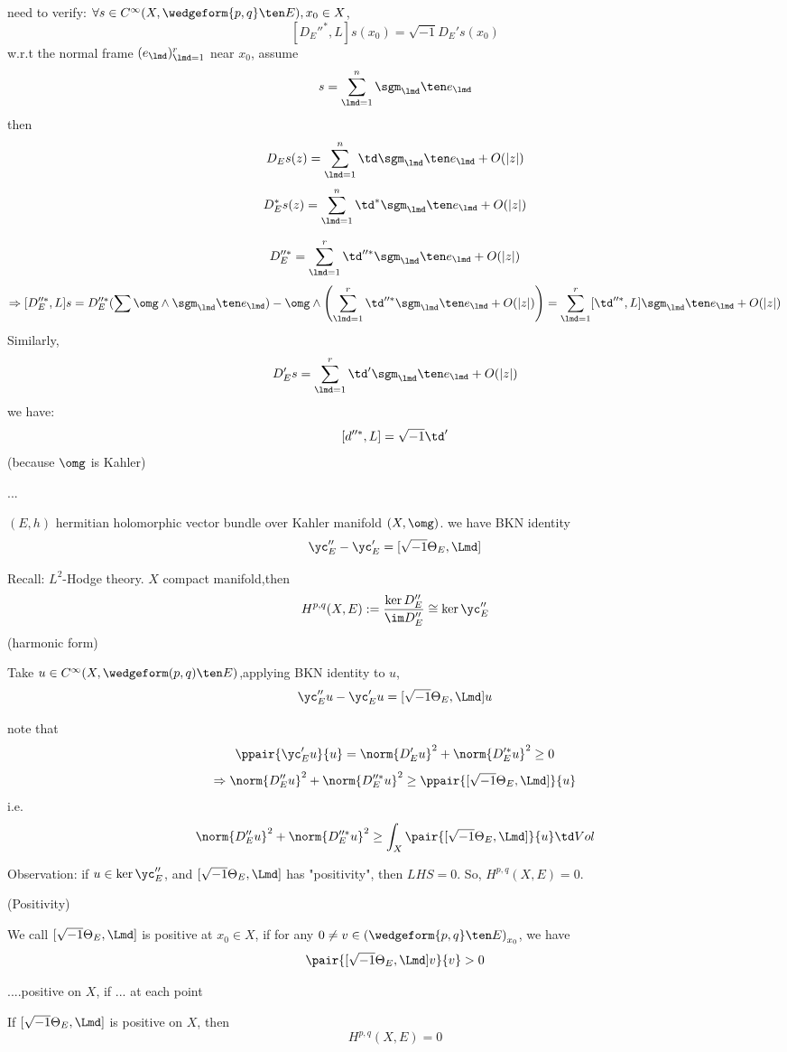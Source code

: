 need to verify: $\forall s\in C^\infty(X,\wedgeform{p,q}\ten E),x_0\in X$,
$$[D_E''^*,L]s(x_0)=\sqrt{-1}D_E's(x_0)$$
w.r.t the normal frame $(e_\lmd)_{\lmd=1}^r$ near $x_0$, assume
$$s=\sum_{\lmd=1}^{n}\sgm_\lmd\ten e_\lmd$$
then
$$
  D_Es(z)=\sum_{\lmd=1}^{n}
    \td\sgm_\lmd\ten e_\lmd +O(|z|)
$$
$$
  D_E^*s(z)=\sum_{\lmd=1}^{n}
    \td^*\sgm_\lmd\ten e_\lmd +O(|z|)
$$

$$D_E''^*=\sum_{\lmd=1}^{r} \td''^*\sgm_\lmd\ten e_\lmd+O(|z|)$$
$$
  \Rightarrow
  [D_E''^*,L]s=
  D_E''^*(\sum\omg\wedge\sgm_\lmd\ten e_\lmd)
 -\omg\wedge
 \left(
   \sum_{\lmd=1}^{r}
   \td''^*\sgm_\lmd\ten e_\lmd+O(|z|)
 \right)
=
  \sum_{\lmd=1}^{r}
    [\td''^*,L]\sgm_\lmd\ten e_\lmd+O(|z|)
$$
Similarly,
$$
  D_E's
=
  \sum_{\lmd=1}^{r}
    \td'\sgm_\lmd\ten e_\lmd+O(|z|)
$$
we have:
$$
  [d''^*,L]=\sqrt{-1}\td'
$$
(because $\omg$ is Kahler)

...

$(E,h)$ hermitian holomorphic vector bundle over Kahler manifold $(X,\omg)$.
we have BKN identity
$$
  \yc_E''-\yc_E'=[\sqrt{-1}\Theta_E,\Lmd]
$$

Recall: $L^2$-Hodge theory. $X$ compact manifold,then
$$
  H^{p,q}(X,E):=
  \frac{\ker D_E''}{\im D_E''}
\cong
  \ker\yc_E''
$$
(harmonic form)

Take $u\in C^\infty(X,\wedgeform(p,q)\ten E)$,applying BKN identity to $u$,
$$\yc_E''u-\yc_E'u=[\sqrt{-1}\Theta_E,\Lmd]u$$

note that
$$\ppair{\yc_E'u}{u}=\norm{D_E'u}^2+\norm{D_E'^*u}^2\geq 0$$
$$
  \Rightarrow
  \norm{D_E''u}^2+\norm{D_E''^*u}^2
\geq
  \ppair{[\sqrt{-1}\Theta_E,\Lmd]}{u}
$$
i.e.
$$
  \norm{D_E''u}^2+\norm{D_E''^*u}^2
\geq
  \int_X\pair{[\sqrt{-1}\Theta_E,\Lmd]}{u}
  \td Vol
$$

Observation: if $u\in\ker\yc_E''$, and $[\sqrt{-1}\Theta_E,\Lmd]$
has "positivity",
then $LHS=0$. So, $H^{p,q}(X,E)=0$.

\begin{definition}(Positivity)

We call $[\sqrt{-1}\Theta_E,\Lmd]$ is positive at $x_0\in X$, if
for any $0\neq v\in\left(\wedgeform{p,q}\ten E\right)_{x_0}$, we have
$$\pair{[\sqrt{-1}\Theta_E,\Lmd]v}{v}>0$$

....positive on $X$, if ... at each point
\end{definition}

\begin{thm}
If $[\sqrt{-1}\Theta_E,\Lmd]$ is positive on $X$, then
$$H^{p,q}(X,E)=0$$
\end{thm}

